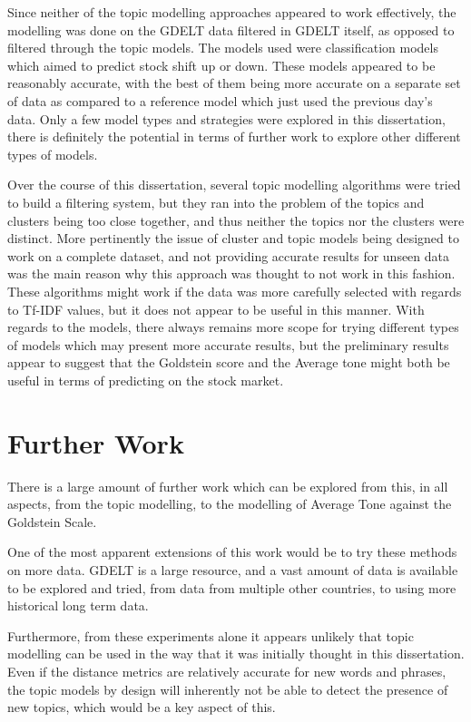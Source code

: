 Since neither of the topic modelling approaches appeared to work effectively, the modelling was done on the GDELT data filtered in GDELT itself, as opposed to filtered through the topic models. The models used were classification models which aimed to predict stock shift up or down. These models appeared to be reasonably accurate, with the best of them being more accurate on a separate set of data as compared to a reference model which just used the previous day's data. Only a few model types and strategies were explored in this dissertation, there is definitely the potential in terms of further work to explore other different types of models.

Over the course of this dissertation, several topic modelling algorithms were tried to build a filtering system, but they ran into the problem of the topics and clusters being too close together, and thus neither the topics nor the clusters were distinct. More pertinently the issue of cluster and topic models being designed to work on a complete dataset, and not providing accurate results for unseen data was the main reason why this approach was thought to not work in this fashion. These algorithms might work if the data was more carefully selected with regards to Tf-IDF values, but it does not appear to be useful in this manner. With regards to the models, there always remains more scope for trying different types of models which may present more accurate results, but the preliminary results appear to suggest that the Goldstein score and the Average tone might both be useful in terms of predicting on the stock market.


\section{Further Work}
There is a large amount of further work which can be explored from this, in all aspects, from the topic modelling, to the modelling of Average Tone against the Goldstein Scale. 

One of the most apparent extensions of this work would be to try these methods on more data. GDELT is a large resource, and a vast amount of data is available to be explored and tried, from data from multiple other countries, to using more historical long term data. 

Furthermore, from these experiments alone it appears unlikely that topic modelling can be used in the way that it was initially thought in this dissertation. Even if the distance metrics are relatively accurate for new words and phrases, the topic models by design will inherently not be able to detect the presence of new topics, which would be a key aspect of this.

